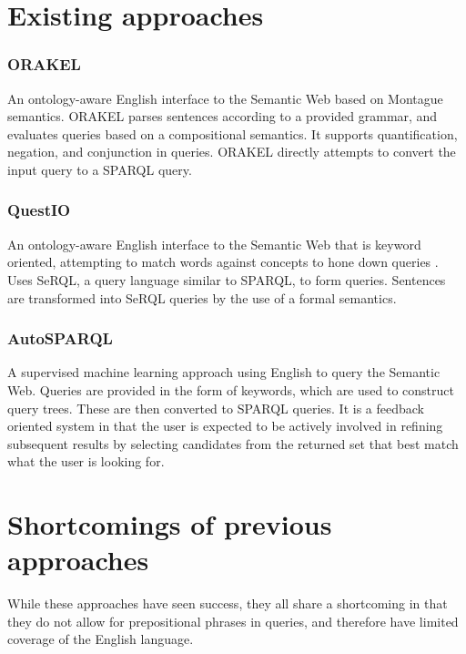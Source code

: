 \documentclass[../main.tex]{subfiles}
\begin{document}
\section {Existing approaches}

\subsubsection{ORAKEL}
An ontology-aware English interface to the Semantic Web based on Montague semantics\cite{cimiano2007orakel}.  ORAKEL parses sentences according to a provided grammar,
and evaluates queries based on a compositional semantics.  It supports quantification, negation, and conjunction in queries.  ORAKEL directly attempts to convert the input query to a SPARQL query.

\subsubsection{QuestIO}
An ontology-aware English interface to the Semantic Web that is keyword oriented, attempting to match words against concepts to hone down queries\cite{tablan2008natural} .  Uses SeRQL\cite{serql}, a query language similar to SPARQL, to form queries.  Sentences are transformed into SeRQL queries by the use of a formal semantics.

\subsubsection{AutoSPARQL}
A supervised machine learning approach using English to query the Semantic Web\cite{lehmann2011autosparql}.  Queries are provided in the form of keywords, which are used to construct query trees.  These are then converted to SPARQL queries.  It is a feedback oriented system in that the user is expected to be actively involved in refining subsequent results by selecting candidates from the returned set that best match what the user is looking for.


\section {Shortcomings of previous approaches}

While these approaches have seen success, they all share a shortcoming in that they do not allow for prepositional phrases in queries, and therefore have limited coverage of the English language.
\end{document}

